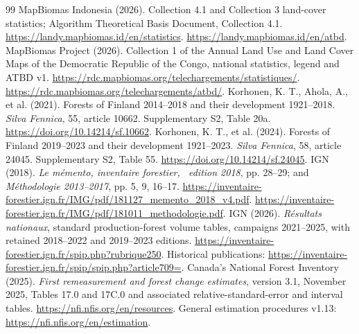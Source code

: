 \documentclass[11pt,a4paper]{article}
\begin{document}
\begin{thebibliography}{99}
 MapBiomas Indonesia (2026). Collection 4.1 and Collection 3 land-cover statistics; Algorithm Theoretical Basis Document, Collection 4.1. \url{https://landy.mapbiomas.id/en/statistics}. \url{https://landy.mapbiomas.id/en/atbd}.
 MapBiomas Project (2026). Collection 1 of the Annual Land Use and Land Cover Maps of the Democratic Republic of the Congo, national statistics, legend and ATBD v1. \url{https://rdc.mapbiomas.org/telechargements/statistiques/}. \url{https://rdc.mapbiomas.org/telechargements/atbd/}.
 Korhonen, K. T., Ahola, A., et al. (2021). Forests of Finland 2014--2018 and their development 1921--2018. \emph{Silva Fennica}, 55, article 10662. Supplementary S2, Table 20a. \url{https://doi.org/10.14214/sf.10662}.
 Korhonen, K. T., et al. (2024). Forests of Finland 2019--2023 and their development 1921--2023. \emph{Silva Fennica}, 58, article 24045. Supplementary S2, Table 55. \url{https://doi.org/10.14214/sf.24045}.
 IGN (2018). \emph{Le m\'emento, inventaire forestier, \ edition 2018}, pp. 28--29; and \emph{M\'ethodologie 2013--2017}, pp. 5, 9, 16--17. \url{https://inventaire-forestier.ign.fr/IMG/pdf/181127_memento_2018_v4.pdf}. \url{https://inventaire-forestier.ign.fr/IMG/pdf/181011_methodologie.pdf}.
 IGN (2026). \emph{R\'esultats nationaux}, standard production-forest volume tables, campaigns 2021--2025, with retained 2018--2022 and 2019--2023 editions. \url{https://inventaire-forestier.ign.fr/spip.php?rubrique250}. Historical publications: \url{https://inventaire-forestier.ign.fr/spip/spip.php?article709=}.
 Canada's National Forest Inventory (2025). \emph{First remeasurement and forest change estimates}, version 3.1, November 2025, Tables 17.0 and 17C.0 and associated relative-standard-error and interval tables. \url{https://nfi.nfis.org/en/resources}. General estimation procedures v1.13: \url{https://nfi.nfis.org/en/estimation}.


\end{thebibliography}
\end{document}
